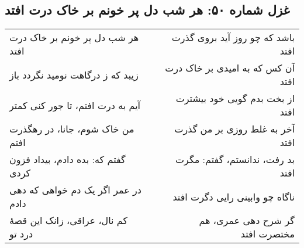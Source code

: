 \begin{center}
\section*{غزل شماره ۵۰: هر شب دل پر خونم بر خاک درت افتد}
\label{sec:050}
\begin{longtable}{l p{0.5cm} r}
هر شب دل پر خونم بر خاک درت افتد
&&
باشد که چو روز آید بروی گذرت افتد
\\
زیبد که ز درگاهت نومید نگردد باز
&&
آن کس که به امیدی بر خاک درت افتد
\\
آیم به درت افتم، تا جور کنی کمتر
&&
از بخت بدم گویی خود بیشترت افتد
\\
من خاک شوم، جانا، در رهگذرت افتم
&&
آخر به غلط روزی بر من گذرت افتد
\\
گفتم که: بده دادم، بیداد فزون کردی
&&
بد رفت، ندانستم، گفتم: مگرت افتد
\\
در عمر اگر یک دم خواهی که دهی دادم
&&
ناگاه چو وابینی رایی دگرت افتد
\\
کم نال، عراقی، زانک این قصهٔ درد تو
&&
گر شرح دهی عمری، هم مختصرت افتد
\\
\end{longtable}
\end{center}
